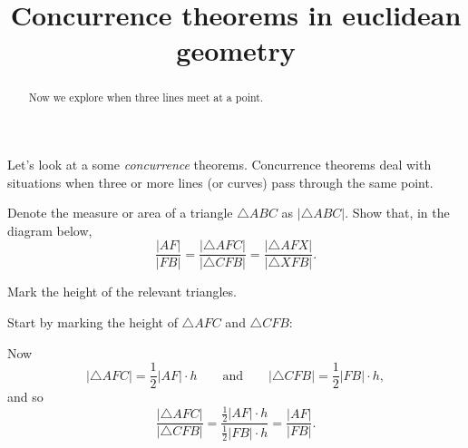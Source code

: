 \documentclass[newpage,hints,handout]{ximera}
\title{Concurrence theorems in euclidean geometry}
\begin{document}
\begin{abstract}
Now we explore when three lines meet at a point.
\end{abstract}
\maketitle

Let's look at a some \textit{concurrence} theorems. Concurrence
theorems deal with situations when three or more lines (or curves)
pass through the same point.

\begin{problem}
\label{25} Denote the measure or area of a triangle $\triangle
ABC$ as $\left\vert \triangle ABC\right\vert $. Show that, in the
diagram below,
\[
\frac{\left\vert AF\right\vert }{\left\vert FB\right\vert }=\frac{\left\vert
\triangle AFC\right\vert }{\left\vert \triangle CFB\right\vert }%
=\frac{\left\vert \triangle AFX\right\vert }{\left\vert \triangle
XFB\right\vert }.
\]
\begin{image}
\end{image}
\begin{hint}
Mark the height of the relevant triangles.
\end{hint}
\begin{freeResponse}
Start by marking the height of $\triangle AFC$ and $\triangle CFB$:
\begin{image}
\end{image}
Now 
\[
|\triangle AFC| = \frac{1}{2} |AF|\cdot h\qquad\text{and}\qquad |\triangle CFB| = \frac{1}{2} |FB|\cdot h,
\]
and so
\[
\frac{|\triangle AFC|}{|\triangle CFB|} = \frac{\frac{1}{2} |AF|\cdot h}{\frac{1}{2} |FB|\cdot h} = \frac{|AF|}{|FB|}.
\]


\end{freeResponse}
\end{problem}
\end{document}
